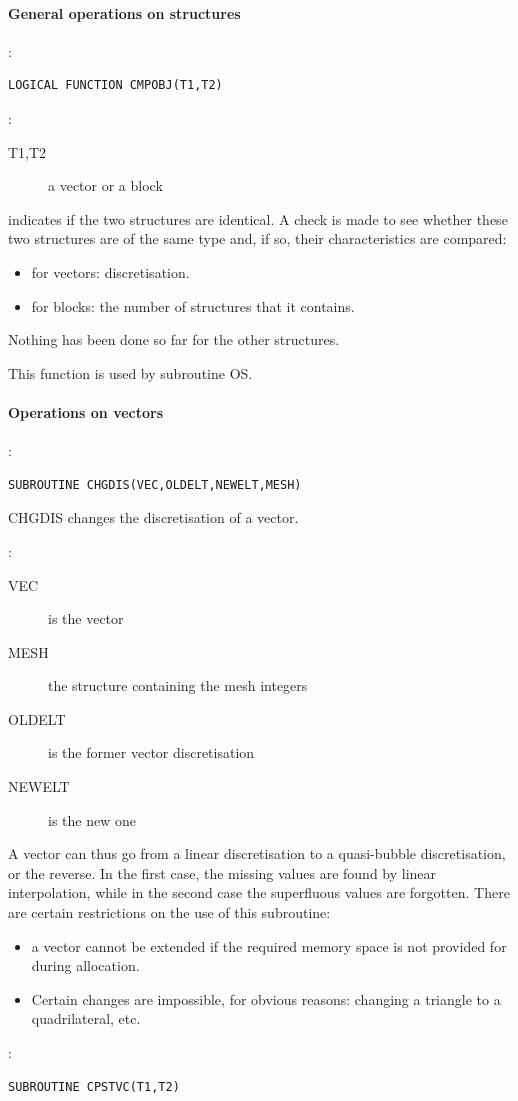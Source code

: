 \paragraph{General operations on structures}

:
\begin{lstlisting}[language=TelFortran]
LOGICAL FUNCTION CMPOBJ(T1,T2)
\end{lstlisting}

:
\begin{description}
  \item [T1,T2]a vector or a block
\end{description}

 indicates if the two structures are identical. A check is made to see
whether these two structures are of the same type and, if so, their
characteristics are compared:
\begin{itemize}
  \item for vectors: discretisation.
  \item for blocks: the number of structures that it contains.
\end{itemize}

Nothing has been done so far for the other structures.

This function is used by subroutine OS.

\paragraph{Operations on vectors}

:
\begin{lstlisting}[language=TelFortran]
SUBROUTINE CHGDIS(VEC,OLDELT,NEWELT,MESH)
\end{lstlisting}

CHGDIS changes the discretisation of a vector.

:
\begin{description}
  \item [VEC] is the vector
  \item [MESH] the structure containing the mesh integers
  \item [OLDELT] is the former vector discretisation
  \item [NEWELT] is the new one
\end{description}
A vector can thus go from a linear discretisation to a quasi-bubble
discretisation, or the reverse. In the first case, the missing values are found
by linear interpolation, while in the second case the superfluous values are
forgotten. There are certain restrictions on the use of this subroutine:
\begin{itemize}
  \item a vector cannot be extended if the required memory space is not
    provided for during allocation.
  \item Certain changes are impossible, for obvious reasons: changing a
    triangle to a quadrilateral, etc.
\end{itemize}
:
\begin{lstlisting}[language=TelFortran]
SUBROUTINE CPSTVC(T1,T2)
\end{lstlisting}

